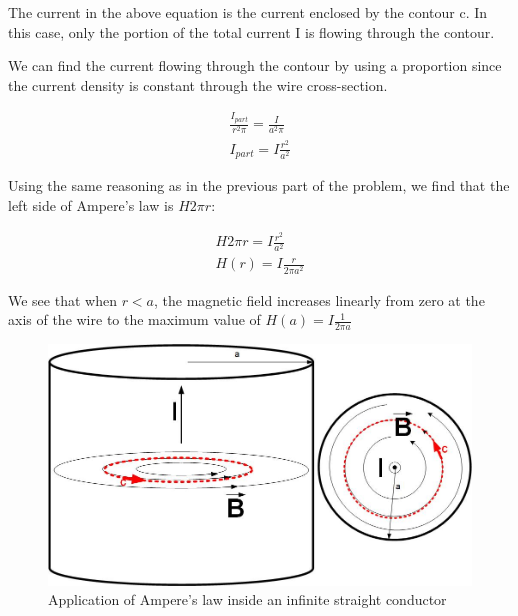 \documentclass{ximera}
\begin{document}
\begin{example}
\begin{explanation}
The current in the above equation is the current enclosed by the contour c. In this case, only the portion of the total current I  is flowing through the contour. 

We can find the current flowing through the contour by using a proportion since the current density is constant through the wire cross-section.

\begin{eqnarray}
\frac{I_{part}}{r^2 \pi}=\frac{I}{a^2 \pi} \\
I_{part}=I \frac{r^2}{a^2}
\end{eqnarray}


Using the same reasoning as in the previous part of the problem, we find that the left side of Ampere's law is $H 2 \pi r$:

\begin{eqnarray}
H 2 \pi r = I \frac{r^2}{a^2} \\
H(r)=I \frac{r}{2 \pi a^2}
\end{eqnarray}

We see that when $r<a$, the magnetic field increases linearly from zero at the axis of the wire to the maximum value of $H(a)=I \frac{1}{2 \pi a}$


\begin{figure}[!ht]
\begin{center}
\includegraphics[scale=0.5]{../jpg/AmperesLaw2.jpg}
\end{center}
\caption{Application of Ampere's law inside an infinite straight conductor}
\label{fig:AmpereInside}
\end{figure}



\end{explanation}

\end{example}
\end{document}
